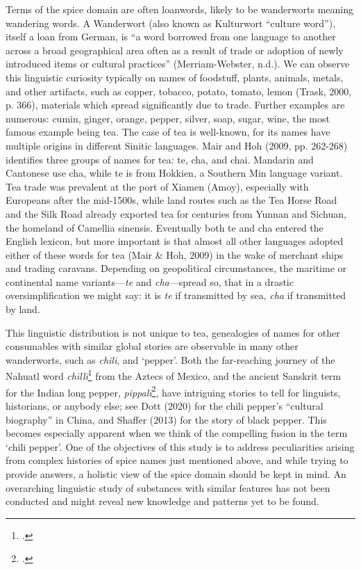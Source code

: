 Terms of the spice domain are often loanwords, likely to be \glspl{wanderwort} meaning wandering words. A Wanderwort (also known as Kulturwort ``culture word''), itself a loan from German, is ``a word borrowed from one language to another across a broad geographical area often as a result of trade or adoption of newly introduced items or cultural practices'' (Merriam-Webster, n.d.). We can observe this linguistic curiosity typically on names of foodstuff, plants, animals, metals, and other artifacts, such as copper, tobacco, potato, tomato, lemon (Trask, 2000, p. 366), materials which spread significantly due to trade. Further examples are numerous: cumin, ginger, orange, pepper, silver, soap, sugar, wine, the most famous example being tea.
The case of tea is well-known, for its names have multiple origins in different Sinitic languages. Mair and Hoh (2009, pp. 262-268) identifies three groups of names for tea: te, cha, and chai. Mandarin and Cantonese use cha, while te is from Hokkien, a Southern Min language variant.
Tea trade was prevalent at the port of Xiamen (Amoy), especially with Europeans after the mid-1500s, while land routes such as the Tea Horse Road and the Silk Road already exported tea for centuries from Yunnan and Sichuan, the homeland of Camellia sinensis. Eventually both te and cha entered the English lexicon, but more important is that almost all other languages adopted either of these words for tea (Mair \& Hoh, 2009) in the wake of merchant ships and trading caravans. Depending on geopolitical circumstances, the maritime or continental name variants---\textit{te} and \textit{cha}---spread so, that in a drastic oversimplification we might say: it is \textit{te} if transmitted by sea, \textit{cha} if transmitted by land.

This linguistic distribution is not unique to tea, genealogies of names for other consumables with similar global stories are observable in many other \glspl{wanderwort}, such as \textit{chili}, and `pepper'. Both the far-reaching journey of the Nahuatl word \textit{chīlli}\footcite[chilli ]{ond} from the Aztecs of Mexico, and the ancient Sanskrit term for the Indian long pepper, \textit{pippalī}\footcite[pippala ]{macdonell_practical_1929}, have intriguing stories to tell for linguists, historians, or anybody else; see Dott (2020) for the chili pepper's ``cultural biography'' in China, and Shaffer (2013) for the story of black pepper. This becomes especially apparent when we think of the compelling fusion in the term `chili pepper'. One of the objectives of this study is to address peculiarities arising from complex histories of spice names just mentioned above, and while trying to provide answers, a holistic view of the spice domain should be kept in mind. An overarching linguistic study of substances with similar features has not been conducted and might reveal new knowledge and patterns yet to be found.

